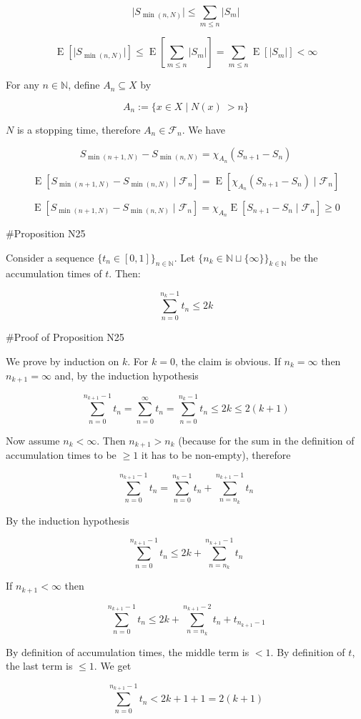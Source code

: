 \documentclass[a4paper]{article}
\DeclareMathOperator{\E}{E}
\newcommand{\Nats}{\mathbb{N}}
\newcommand{\Abs}[1]{\lvert #1 \rvert}
\newcommand{\F}{\mathcal{F}}
\begin{document}
$$\Abs{S_{\min(n,N)}} \leq \sum_{m \leq n} \Abs{S_m}$$

$$\E[\Abs{S_{\min(n,N)}}] \leq \E[\sum_{m \leq n} \Abs{S_m}] = \sum_{m \leq n} \E[\Abs{S_m}] < \infty$$

For any ${n \in \Nats}$, define ${A_n \subseteq X}$ by

$$A_n:=\{x \in X \mid N(x)\ > n\}$$

${N}$ is a stopping time, therefore ${A_n \in \F_n}$. We have 

$${S_{\min(n+1,N)} - S_{\min(n,N)} = \chi_{A_n} (S_{n+1} - S_n)}$$

$${\E[S_{\min(n+1,N)} - S_{\min(n,N)} \mid \F_n] = \E[\chi_{A_n} (S_{n+1} - S_n) \mid \F_n]}$$

$${\E[S_{\min(n+1,N)} - S_{\min(n,N)} \mid \F_n] = \chi_{A_n} \E[ S_{n+1} - S_n \mid \F_n] \geq 0}$$

\#Proposition N25

Consider a sequence ${\{t_n \in [0,1]\}_{n \in \Nats}}$. Let ${\{n_k \in \Nats \sqcup \{\infty\}\}_{k \in \Nats}}$ be the accumulation times of ${t}$. Then:

$$\sum_{n = 0}^{n_k - 1} t_n \leq 2k$$

\#Proof of Proposition N25

We prove by induction on ${k}$. For ${k = 0}$, the claim is obvious. If ${n_k = \infty}$ then ${n_{k+1}=\infty}$ and, by the induction hypothesis

$$\sum_{n = 0}^{n_{k+1} - 1} t_n = \sum_{n = 0}^{\infty} t_n = \sum_{n = 0}^{n_k - 1} t_n \leq 2k \leq 2(k+1)$$

Now assume ${n_k < \infty}$. Then ${n_{k+1} > n_k}$ (because for the sum in the definition of accumulation times to be ${\geq 1}$ it has to be non-empty), therefore

$$\sum_{n = 0}^{n_{k+1} - 1} t_n = \sum_{n = 0}^{n_k - 1} t_n + \sum_{n = n_k}^{n_{k+1} - 1} t_n$$

By the induction hypothesis

$$\sum_{n = 0}^{n_{k+1} - 1} t_n \leq 2k + \sum_{n = n_k}^{n_{k+1} - 1} t_n$$

If ${n_{k+1} < \infty}$ then

$$\sum_{n = 0}^{n_{k+1} - 1} t_n \leq 2k + \sum_{n = n_k}^{n_{k+1} - 2} t_n + t_{n_{k+1}-1}$$

By definition of accumulation times, the middle term is ${< 1}$. By definition of ${t}$, the last term is ${\leq 1}$. We get

$$\sum_{n = 0}^{n_{k+1} - 1} t_n < 2k + 1 + 1 = 2(k+1)$$
\end{document}
